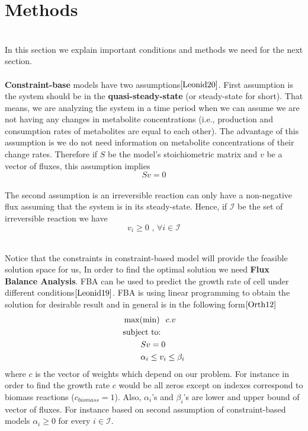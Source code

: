 \documentclass[11pt, a4paper]{article}
\begin{document}
	\section{Methods}
	
	~\\ In this section we explain important conditions and methods we need for the next section.\\
	
	~\\\textbf{Constraint-base} models have two assumptions$\cite{Leonid20}$. First assumption is the system should be in the \textbf{quasi-steady-state} (or steady-state for short). That means, we are analyzing the system in a time period when we can assume we are not having any changes in metabolite concentrations (i.e., production and consumption rates of metabolites are equal to each other). The advantage of this assumption is we do not need information on metabolite concentrations of their change rates. Therefore if $S$ be the model's stoichiometric matrix and $v$ be a vector of fluxes, this assumption implies 
	$$Sv=0$$
	~\\The second assumption is an irreversible reaction can only have a non-negative flux assuming that the system is in its steady-state. Hence, if $\mathcal{I}$ be the set of irreversible reaction we have 
	$$v_i\geq 0\text{ , } \forall i \in \mathcal{I}$$

	~\\Notice that the constraints in constraint-based model will provide the feasible solution space for us, In order to find the optimal solution we need \textbf{Flux Balance Analysis}. FBA can be used to predict the growth rate of cell under different conditions$\cite{Leonid19}$. FBA is using linear programming to obtain the solution for desirable result and in general is in the following form$\cite{Orth12}$
	\begin{align*}
	&\max(\min)\hspace{.1in} c.v\\
	& \text{subject to:}\\
	&\hspace{.3in}Sv= 0\\
	& \hspace{.3in}\alpha_i\leq v_i \leq \beta_i
	\end{align*}
	where $c$ is the vector of weights which depend on our problem. For instance in order to find the growth rate $c$ would be all zeros except on indexes correspond to biomass reactions ($c_{biomass}=1$). Also, $\alpha_i$'s and $\beta_i$'s are lower and upper bound of vector of fluxes. For instance based on second assumption of constraint-based models $\alpha_i\geq 0$ for every $i\in \mathcal{I}$.
\end{document}
